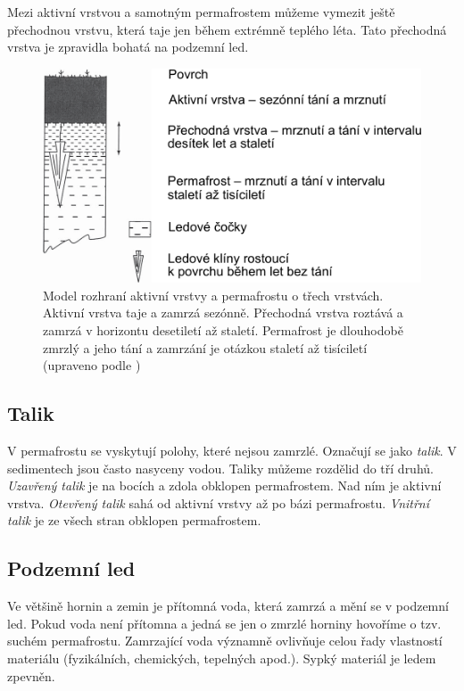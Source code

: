 Mezi aktivní vrstvou a samotným permafrostem můžeme vymezit ještě přechodnou vrstvu, která taje jen během extrémně teplého léta. Tato přechodná vrstva je zpravidla bohatá na podzemní led.

\begin{figure}[h]
	\centering
	\includegraphics[width=0.7\linewidth]{obrazky/periglac/aktivni_vrstva}
	\caption{Model rozhraní aktivní vrstvy a permafrostu o třech vrstvách. Aktivní vrstva taje a zamrzá sezónně. Přechodná vrstva roztává a zamrzá v horizontu desetiletí až staletí. Permafrost je dlouhodobě zmrzlý a jeho tání a zamrzání je otázkou staletí až tisíciletí (upraveno podle \textcite{frenchPeriglacialEnvironment2017})}
	\label{fig:aktivnivrstva}
\end{figure}


\subsection{Talik}
V permafrostu se vyskytují polohy, které nejsou zamrzlé. Označují se jako \emph{talik}. V sedimentech jsou často nasyceny vodou. Taliky můžeme rozdělid do tří druhů. \emph{Uzavřený talik} je na bocích a zdola obklopen permafrostem. Nad ním je aktivní vrstva. \emph{Otevřený talik} sahá od aktivní vrstvy až po bázi permafrostu. \emph{Vnitřní talik} je ze všech stran obklopen permafrostem. 

\subsection{Podzemní led}
Ve většině hornin a zemin je přítomná voda, která zamrzá a mění se v podzemní led. Pokud voda není přítomna a jedná se jen o zmrzlé horniny hovoříme o tzv. suchém permafrostu. Zamrzající voda významně ovlivňuje celou řady vlastností materiálu (fyzikálních, chemických, tepelných apod.). Sypký materiál je ledem zpevněn.


